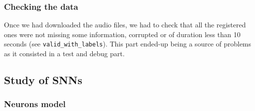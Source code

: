 \documentclass[11pt]{article}
\begin{document}
\subsubsection*{Checking the data}

Once we had downloaded the audio files, we had to check that all the registered ones were not missing some information, corrupted or of duration less than 10 seconds (see \texttt{valid\_with\_labels}). This part ended-up being a source of problems as it consisted in a test and debug part.

\pagebreak

\subsection{Study of SNNs}

\subsubsection{Neurons model}
\end{document}
